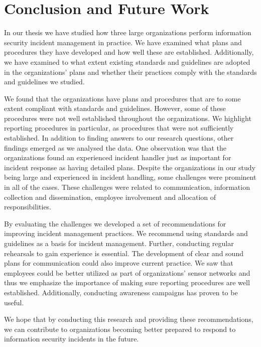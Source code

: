 \chapter{Conclusion and Future Work}
\label{chp:conclusion}
In our thesis we have studied how three large organizations perform information security incident management in practice. We have examined what plans and procedures they have developed and how well these are established. Additionally, we have examined to what extent existing standards and guidelines are adopted in the organizations' plans and whether their practices comply with the standards and guidelines we studied.

We found that the organizations have plans and procedures that are to some extent compliant with standards and guidelines. However, some of these procedures were not well established throughout the organizations. We highlight reporting procedures in particular, as procedures that were not sufficiently established. In addition to finding answers to our research questions, other findings emerged as we analysed the data. One observation was that the organizations found an experienced incident handler just as important for incident response as having detailed plans. Despite the organizations in our study being large and experienced in incident handling, some challenges were prominent in all of the cases. These challenges were related to communication, information collection and dissemination, employee involvement and allocation of responsibilities. 

By evaluating the challenges we developed a set of recommendations for improving incident management practices. We recommend using standards and guidelines as a basis for incident management. Further, conducting regular rehearsals to gain experience is essential. The development of clear and sound plans for communication could also improve current practice. We saw that employees could be better utilized as part of organizations' sensor networks and thus we emphasize the importance of making sure reporting procedures are well established. Additionally, conducting awareness campaigns has proven to be useful. 

We hope that by conducting this research and providing these recommendations, we can contribute to organizations becoming better prepared to respond to information security incidents in the future. 

